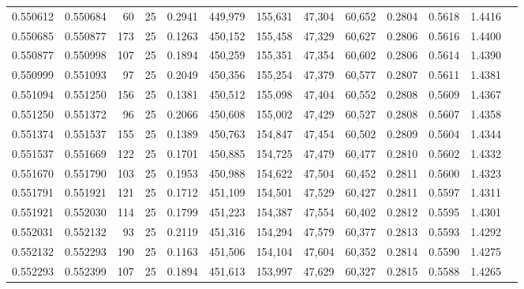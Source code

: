 \begin{tabular}{rrrrrrrrrrrrr}
0.550612 & 0.550684 &    60 &  25 &                                     0.2941 & 449,979 & 155,631 &  47,304 &  60,652 & 0.2804 & 0.5618 & 1.4416 \\
0.550685 & 0.550877 &   173 &  25 &                                     0.1263 & 450,152 & 155,458 &  47,329 &  60,627 & 0.2806 & 0.5616 & 1.4400 \\
0.550877 & 0.550998 &   107 &  25 &                                     0.1894 & 450,259 & 155,351 &  47,354 &  60,602 & 0.2806 & 0.5614 & 1.4390 \\
0.550999 & 0.551093 &    97 &  25 &                                     0.2049 & 450,356 & 155,254 &  47,379 &  60,577 & 0.2807 & 0.5611 & 1.4381 \\
0.551094 & 0.551250 &   156 &  25 &                                     0.1381 & 450,512 & 155,098 &  47,404 &  60,552 & 0.2808 & 0.5609 & 1.4367 \\
0.551250 & 0.551372 &    96 &  25 &                                     0.2066 & 450,608 & 155,002 &  47,429 &  60,527 & 0.2808 & 0.5607 & 1.4358 \\
0.551374 & 0.551537 &   155 &  25 &                                     0.1389 & 450,763 & 154,847 &  47,454 &  60,502 & 0.2809 & 0.5604 & 1.4344 \\
0.551537 & 0.551669 &   122 &  25 &                                     0.1701 & 450,885 & 154,725 &  47,479 &  60,477 & 0.2810 & 0.5602 & 1.4332 \\
0.551670 & 0.551790 &   103 &  25 &                                     0.1953 & 450,988 & 154,622 &  47,504 &  60,452 & 0.2811 & 0.5600 & 1.4323 \\
0.551791 & 0.551921 &   121 &  25 &                                     0.1712 & 451,109 & 154,501 &  47,529 &  60,427 & 0.2811 & 0.5597 & 1.4311 \\
0.551921 & 0.552030 &   114 &  25 &                                     0.1799 & 451,223 & 154,387 &  47,554 &  60,402 & 0.2812 & 0.5595 & 1.4301 \\
0.552031 & 0.552132 &    93 &  25 &                                     0.2119 & 451,316 & 154,294 &  47,579 &  60,377 & 0.2813 & 0.5593 & 1.4292 \\
0.552132 & 0.552293 &   190 &  25 &                                     0.1163 & 451,506 & 154,104 &  47,604 &  60,352 & 0.2814 & 0.5590 & 1.4275 \\
0.552293 & 0.552399 &   107 &  25 &                                     0.1894 & 451,613 & 153,997 &  47,629 &  60,327 & 0.2815 & 0.5588 & 1.4265 \\

\end{tabular}
